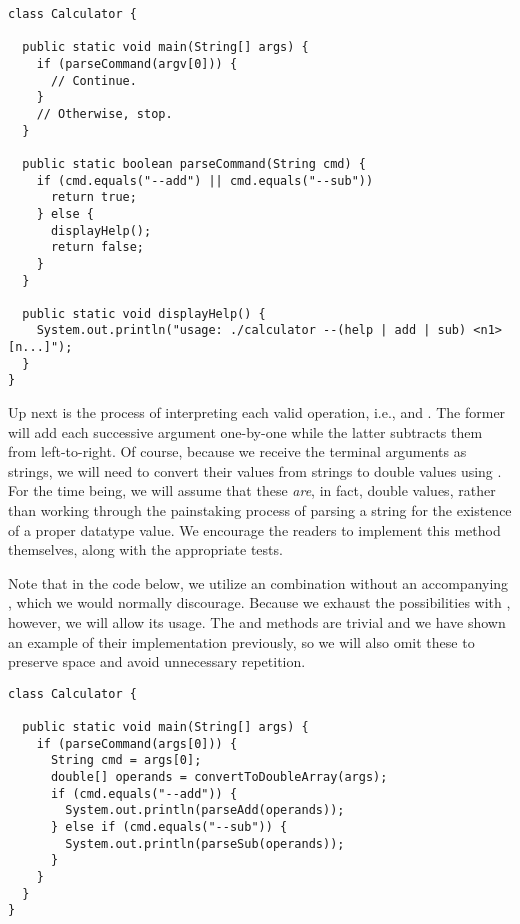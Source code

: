 \begin{cl}{}
\begin{lstlisting}[language=MyJava]
class Calculator {

  public static void main(String[] args) {
    if (parseCommand(argv[0])) {
      // Continue.
    }
    // Otherwise, stop.
  }

  public static boolean parseCommand(String cmd) {
    if (cmd.equals("--add") || cmd.equals("--sub")) 
      return true;
    } else {
      displayHelp();
      return false;
    }
  }

  public static void displayHelp() {
    System.out.println("usage: ./calculator --(help | add | sub) <n1> [n...]");
  }
}
\end{lstlisting}
\end{cl}

Up next is the process of interpreting each valid operation, i.e.,  and . The former will add each successive argument one-by-one while the latter subtracts them from left-to-right. Of course, because we receive the terminal arguments as strings, we will need to convert their values from strings to double values using . For the time being, we will assume that these \textit{are}, in fact, double values, rather than working through the painstaking process of parsing a string for the existence of a proper  datatype value. We encourage the readers to implement this method themselves, along with the appropriate tests.

Note that in the code below, we utilize an  combination without an accompanying , which we would normally discourage. Because we exhaust the possibilities with , however, we will allow its usage. The  and  methods are trivial and we have shown an example of their implementation previously, so we will also omit these to preserve space and avoid unnecessary repetition.

\begin{cl}{}
\begin{lstlisting}[language=MyJava]
class Calculator {

  public static void main(String[] args) {
    if (parseCommand(args[0])) {
      String cmd = args[0];
      double[] operands = convertToDoubleArray(args);
      if (cmd.equals("--add")) {
        System.out.println(parseAdd(operands));
      } else if (cmd.equals("--sub")) {
        System.out.println(parseSub(operands));
      }
    }
  }
}
\end{lstlisting}
\end{cl}

